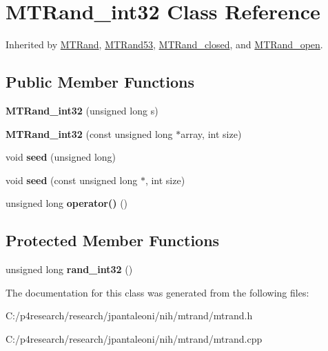 \hypertarget{class_m_t_rand__int32}{
\section{\-M\-T\-Rand\-\_\-int32 \-Class \-Reference}
\label{class_m_t_rand__int32}
}


\-Inherited by \hyperlink{class_m_t_rand}{\-M\-T\-Rand}, \hyperlink{class_m_t_rand53}{\-M\-T\-Rand53}, \hyperlink{class_m_t_rand__closed}{\-M\-T\-Rand\-\_\-closed}, and \hyperlink{class_m_t_rand__open}{\-M\-T\-Rand\-\_\-open}.

\subsection*{\-Public \-Member \-Functions}
\begin{DoxyCompactItemize}
\item 
\hypertarget{class_m_t_rand__int32_ad30f7c63a6f1fb3c3b76b8ce6ffa0206}{
{\bfseries \-M\-T\-Rand\-\_\-int32} (unsigned long s)}
\label{class_m_t_rand__int32_ad30f7c63a6f1fb3c3b76b8ce6ffa0206}

\item 
\hypertarget{class_m_t_rand__int32_a19acddb3910a7282517b2ffc398b92b4}{
{\bfseries \-M\-T\-Rand\-\_\-int32} (const unsigned long $\ast$array, int size)}
\label{class_m_t_rand__int32_a19acddb3910a7282517b2ffc398b92b4}

\item 
\hypertarget{class_m_t_rand__int32_a0c57076fe30358e0700a7ce1baa0ea27}{
void {\bfseries seed} (unsigned long)}
\label{class_m_t_rand__int32_a0c57076fe30358e0700a7ce1baa0ea27}

\item 
\hypertarget{class_m_t_rand__int32_a3cabc1e3445716236a570ffd2f69686d}{
void {\bfseries seed} (const unsigned long $\ast$, int size)}
\label{class_m_t_rand__int32_a3cabc1e3445716236a570ffd2f69686d}

\item 
\hypertarget{class_m_t_rand__int32_ad7fe22190d0411c6dac8e6f471633aa4}{
unsigned long {\bfseries operator()} ()}
\label{class_m_t_rand__int32_ad7fe22190d0411c6dac8e6f471633aa4}

\end{DoxyCompactItemize}
\subsection*{\-Protected \-Member \-Functions}
\begin{DoxyCompactItemize}
\item 
\hypertarget{class_m_t_rand__int32_abacdfa346255baeac69d29bb57f29b22}{
unsigned long {\bfseries rand\-\_\-int32} ()}
\label{class_m_t_rand__int32_abacdfa346255baeac69d29bb57f29b22}

\end{DoxyCompactItemize}


\-The documentation for this class was generated from the following files\-:\begin{DoxyCompactItemize}
\item 
\-C\-:/p4research/research/jpantaleoni/nih/mtrand/mtrand.\-h\item 
\-C\-:/p4research/research/jpantaleoni/nih/mtrand/mtrand.\-cpp\end{DoxyCompactItemize}
